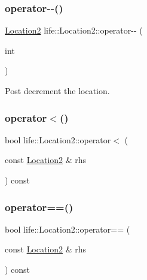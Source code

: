 \subsubsection{\texorpdfstring{operator-\/-\/()}{operator--()}\hspace{0.1cm}{\footnotesize\ttfamily [2/2]}}
{\footnotesize\ttfamily \mbox{\hyperlink{structlife_1_1_location2}{Location2}} life\+::\+Location2\+::operator-\/-\/ (\begin{DoxyParamCaption}\item[{int}]{ }\end{DoxyParamCaption})\hspace{0.3cm}{\ttfamily [inline]}}



Post decrement the location. 

\mbox{\label{structlife_1_1_location2_a7b2c75c69ca74555939fed80c3b1843f}} 
\subsubsection{\texorpdfstring{operator$<$()}{operator<()}}
{\footnotesize\ttfamily bool life\+::\+Location2\+::operator$<$ (\begin{DoxyParamCaption}\item[{const \mbox{\hyperlink{structlife_1_1_location2}{Location2}} \&}]{rhs }\end{DoxyParamCaption}) const\hspace{0.3cm}{\ttfamily [inline]}}

\mbox{\label{structlife_1_1_location2_a73176a88dbec1ec8936f029eeeab2ff3}} 
\subsubsection{\texorpdfstring{operator==()}{operator==()}}
{\footnotesize\ttfamily bool life\+::\+Location2\+::operator== (\begin{DoxyParamCaption}\item[{const \mbox{\hyperlink{structlife_1_1_location2}{Location2}} \&}]{rhs }\end{DoxyParamCaption}) const\hspace{0.3cm}{\ttfamily [inline]}}



